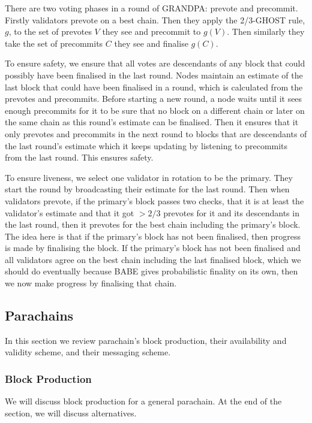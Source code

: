 \documentclass{article}
\begin{document}
There are two voting phases in a round of GRANDPA: prevote and precommit. Firstly validators prevote on a best chain. Then they apply the 2/3-GHOST rule, $g$, to the set of prevotes $V$ they see and precommit to $g(V)$. Then similarly they take the set of precommits $C$ they see and finalise $g(C)$.

To ensure safety, we ensure that all votes are descendants of any block that could possibly have been finalised in the last round. Nodes maintain an estimate of the last block that could have been finalised in a round, which is calculated from the prevotes and precommits. Before starting a new round, a node waits until it sees enough precommits for it to be sure that no block on a different chain or later on the same chain as this round's estimate can be finalised. Then it ensures that it only prevotes and precommits in the next round to blocks that are descendants of the last round's estimate which it keeps updating by listening to precommits from the last round. This ensures safety.

To ensure liveness, we select one validator in rotation to be the primary. They start the round by broadcasting their estimate for the last round. Then when validators prevote, if the primary's block passes two checks, that it is at least the validator's estimate and that it got $>2/3$ prevotes for it and its descendants in the last round, then it prevotes for the best chain including the primary's block. The idea here is that if the primary's block has not been finalised, then progress is made by finalising the block. If the primary's block has not been finalised and all validators agree on the best chain including the last finalised block, which we should do eventually because BABE gives probabilistic finality on its own, then we now make progress by finalising that chain.




\subsection{Parachains}\label{sec:parachains}
In this section we review parachain's block production, their availability and validity scheme, and their messaging scheme.
\subsubsection{Block Production}\label{sec:parachainblockproduction}

We will discuss block production for a general parachain. At the end of the section, we will discuss alternatives.
\end{document}
